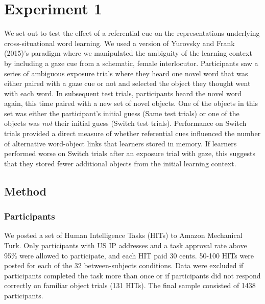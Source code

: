 \documentclass[authoryear, review]{elsarticle}
\begin{document}
\section{Experiment 1}\label{experiment-1}

We set out to test the effect of a referential cue on the
representations underlying cross-situational word learning. We used a
version of Yurovsky and Frank (2015)'s paradigm where we manipulated the
ambiguity of the learning context by including a gaze cue from a
schematic, female interlocutor. Participants saw a series of ambiguous
exposure trials where they heard one novel word that was either paired
with a gaze cue or not and selected the object they thought went with
each word. In subsequent test trials, participants heard the novel word
again, this time paired with a new set of novel objects. One of the
objects in this set was either the participant's initial guess (Same
test trials) or one of the objects was \emph{not} their initial guess
(Switch test trials). Performance on Switch trials provided a direct
measure of whether referential cues influenced the number of alternative
word-object links that learners stored in memory. If learners performed
worse on Switch trials after an exposure trial with gaze, this suggests
that they stored fewer additional objects from the initial learning
context.

\subsection{Method}\label{method}

\subsubsection{Participants}\label{participants}

We posted a set of Human Intelligence Tasks (HITs) to Amazon Mechanical
Turk. Only participants with US IP addresses and a task approval rate
above 95\% were allowed to participate, and each HIT paid 30 cents.
50-100 HITs were posted for each of the 32 between-subjects conditions.
Data were excluded if participants completed the task more than once or
if participants did not respond correctly on familiar object trials (131
HITs). The final sample consisted of 1438 participants.
\end{document}
